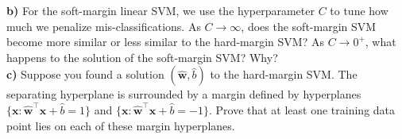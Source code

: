 \documentclass[a4paper]{article}
\begin{document}
\textbf{b)} For the soft-margin linear SVM, we use the hyperparameter $C$ to tune how much we penalize mis-classifications. As $C\rightarrow\infty$, does the soft-margin SVM become more similar or less similar to the hard-margin SVM? As $C\rightarrow 0^+$, what happens to the solution of the soft-margin SVM? Why?\\

\textbf{c)} Suppose you found a solution $(\mathbf{\hat w},\hat b)$ to the hard-margin SVM. The separating hyperplane is surrounded by a margin defined by hyperplanes $\{\mathbf{x}: \mathbf{\hat w}^\top\mathbf{x}+\hat b=1\}$ and $\{\mathbf{x}: \mathbf{\hat w}^\top\mathbf{x}+\hat b=-1\}$. Prove that at least one training data point lies on each of these margin hyperplanes.\\
\end{document}
